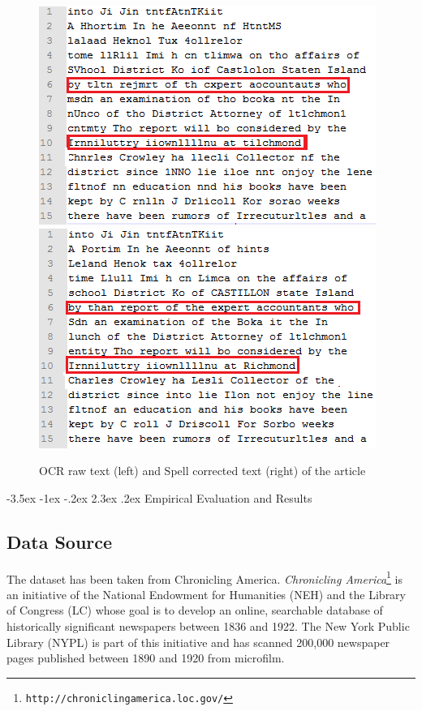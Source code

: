 \documentclass[12pt]{article}
\makeatletter
\renewcommand\section{\@startsection{section}{1}{\z@}%
                                  {-3.5ex \@plus -1ex \@minus -.2ex}%
                                  {2.3ex \@plus.2ex}%
                                  {\normalfont\bfseries}}
\makeatother
\begin{document}
\begin{figure}[!htb]
\includegraphics[scale=0.75]{ocr3}
\includegraphics[scale=0.75]{corrected3}
\caption{OCR raw text (left) and Spell corrected text (right) of the article}
\label{figure:4}
\end{figure} 

\section{Empirical Evaluation and Results}
\label{spell:results}



\subsection{Data Source} 


The dataset has been taken from Chronicling America.
\noindent \emph{Chronicling
America}\footnote{\texttt{http://chroniclingamerica.loc.gov/}} is an
initiative of the National Endowment for Humanities (NEH) and the
Library of Congress (LC) whose goal is to develop an online,
searchable database of historically significant newspapers between
1836 and 1922. The New York Public Library (NYPL) is part of this
initiative and has scanned 200,000 newspaper pages published between
1890 and 1920 from microfilm.
\end{document}
